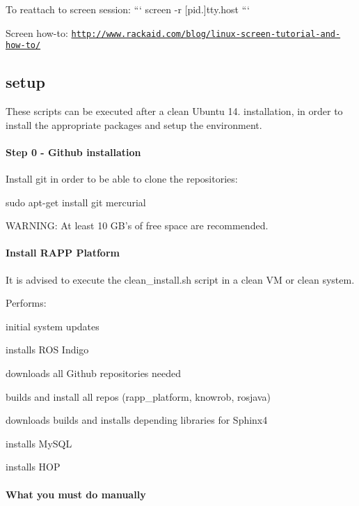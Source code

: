 To reattach to screen session\-: ``` screen -\/r \mbox{[}pid.\mbox{]}tty.\-host ```

Screen how-\/to\-: \href{http://www.rackaid.com/blog/linux-screen-tutorial-and-how-to/}{\tt http\-://www.\-rackaid.\-com/blog/linux-\/screen-\/tutorial-\/and-\/how-\/to/}

\subsection*{setup}

These scripts can be executed after a clean Ubuntu 14. installation, in order to install the appropriate packages and setup the environment.

\paragraph*{Step 0 -\/ Github installation}

Install git in order to be able to clone the repositories\-:

{\ttfamily sudo apt-\/get install git mercurial}

W\-A\-R\-N\-I\-N\-G\-: At least 10 G\-B's of free space are recommended.

\paragraph*{Install R\-A\-P\-P Platform}

It is advised to execute the clean\-\_\-install.\-sh script in a clean V\-M or clean system.

Performs\-:
\begin{DoxyItemize}
\item initial system updates
\item installs R\-O\-S Indigo
\item downloads all Github repositories needed
\item builds and install all repos (rapp\-\_\-platform, knowrob, rosjava)
\item downloads builds and installs depending libraries for Sphinx4
\item installs My\-S\-Q\-L
\item installs H\-O\-P
\end{DoxyItemize}

\paragraph*{What you must do manually}

